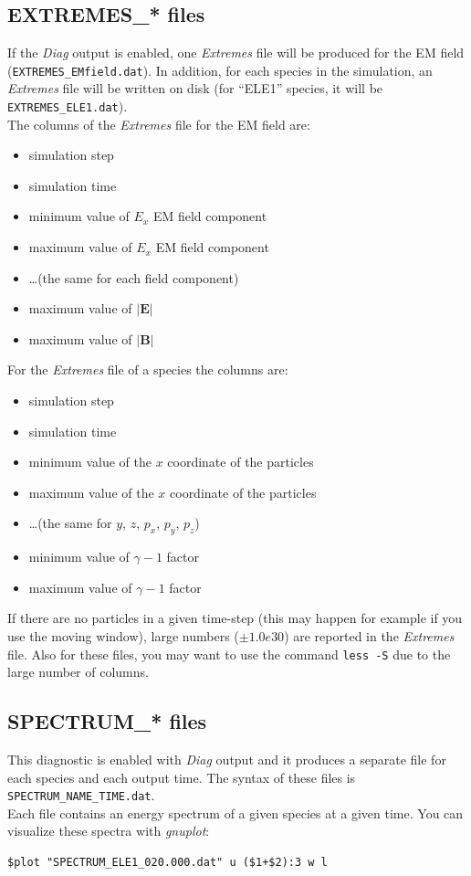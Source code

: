 \documentclass[11pt,a4paper]{report}
\begin{document}
\subsection{EXTREMES\_* files}
If the \emph{Diag} output is enabled, one \emph{Extremes} file will be produced for the EM field (\verb+EXTREMES_EMfield.dat+). In addition, for each species in the simulation, an \emph{Extremes} file will be written on disk (for ``ELE1'' species, it will be \verb+EXTREMES_ELE1.dat+).\\
The columns of the \emph{Extremes} file for the EM field are:
\begin{itemize}
\item simulation step
\item simulation time
\item minimum value of $E_x$ EM field component
\item maximum value of $E_x$ EM field component
\item \ldots (the same for each field component)
\item maximum value of ${\vert\mathbf{E}\vert}$
\item maximum value of ${\vert\mathbf{B}\vert}$
\end{itemize}
For the \emph{Extremes} file of a species the columns are:
\begin{itemize}
\item simulation step
\item simulation time
\item minimum value of the $x$ coordinate of the particles
\item maximum value of the $x$ coordinate of the particles
\item \ldots (the same for $y$, $z$, $p_x$, $p_y$, $p_z$)
\item minimum value of $\gamma - 1$ factor
\item maximum value of $\gamma - 1$ factor
\end{itemize}
If there are no particles in a given time-step (this may happen for example if you use the moving window), large numbers ($\pm 1.0e30$) are reported in the  \emph{Extremes} file.
Also for these files, you may want to use the command \verb+less -S+ due to the large number of columns.
\subsection{SPECTRUM\_* files}
This diagnostic is enabled with \emph{Diag} output and it produces a separate file for each species and each output time. The syntax of these files is \verb+SPECTRUM_NAME_TIME.dat+.\\
Each file contains an energy spectrum of a given species at a given time. You can visualize these spectra with \emph{gnuplot}:
\begin{verbatim}
$plot "SPECTRUM_ELE1_020.000.dat" u ($1+$2):3 w l
\end{verbatim}
\end{document}
